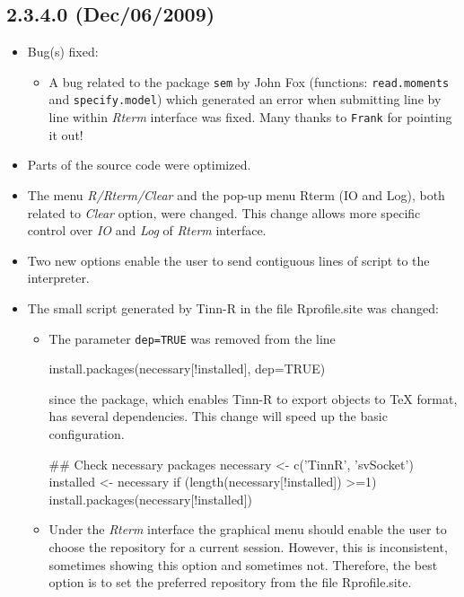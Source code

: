 \subsection*{2.3.4.0 (Dec/06/2009)}
\begin{itemize}
  \item Bug(s) fixed:
    \begin{itemize}
      \item A bug related to the package \texttt{sem} by John Fox
        (functions: \texttt{read.moments} and \texttt{specify.model})
        which generated an error when submitting line by line within
        \textit{Rterm} interface was fixed. Many thanks to \texttt{Frank}
        for pointing it out!
    \end{itemize}
  \item Parts of the source code were optimized.
  \item The menu \textit{R/Rterm/Clear} and the pop-up menu Rterm
    (IO and Log), both related to \textit{Clear} option, were changed.
    This change allows more specific control over \textit{IO} and
    \textit{Log} of \textit{Rterm} interface.
  \item Two new options enable the user to send contiguous lines
    of script to the \RR{} interpreter.
  \item The small script generated by Tinn-R in the file Rprofile.site was
    changed:
    \begin{itemize}
      \item The parameter \texttt{dep=TRUE} was removed from the line

        \begin{Scode}
          install.packages(necessary[!installed], dep=TRUE)
        \end{Scode}

        since the  package, which enables Tinn-R to export
        \RR{} objects to TeX format, has several dependencies. This
        change will speed up the basic \RR{} configuration.

        \begin{Scode}
          ## Check necessary packages
          necessary <- c('TinnR', 'svSocket')
          installed <- necessary %
          if (length(necessary[!installed]) >=1)
          install.packages(necessary[!installed])
        \end{Scode}

      \item Under the \textit{Rterm} interface the graphical menu should enable the
        user to choose the repository for a current session. However, this is
        inconsistent, sometimes showing this option and sometimes not. Therefore,
        the best option is to set the preferred repository from the file Rprofile.site.
    \end{itemize}
\end{itemize}


